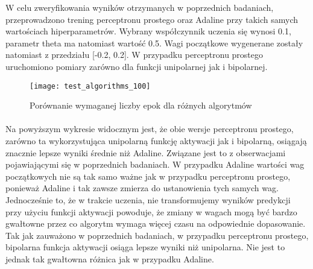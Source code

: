 \documentclass[\main/main.tex]{subfiles}
\begin{document}
    \justify
    W celu zweryfikowania wyników otrzymanych w poprzednich badaniach, przeprowadzono trening perceptronu prostego oraz Adaline przy takich samych wartościach hiperparametrów. Wybrany współczynnik uczenia się wynosi 0.1, parametr theta ma natomiast wartość 0.5. Wagi początkowe wygenerane zostały natomiast z przedziału [-0.2, 0.2]. W przypadku perceptronu prostego uruchomiono pomiary zarówno dla funkcji unipolarnej jak i bipolarnej.
    
    \begin{figure}[H]
    \centering
    \texttt{[image: test\_algorithms\_100]}
    \caption{Porównanie wymaganej liczby epok dla różnych algorytmów}
    \end{figure}
    
    \paragraph{}
    Na powyższym wykresie widocznym jest, że obie wersje perceptronu prostego, zarówno ta wykorzystująca unipolarną funkcję aktywacji jak i bipolarną, osiągają znacznie lepsze wyniki średnie niż Adaline. Związane jest to z obserwacjami pojawiającymi się w poprzednich badaniach. W przypadku Adaline wartości wag początkowych nie są tak samo ważne jak w przypadku perceptronu prostego, ponieważ Adaline i tak zawsze zmierza do ustanowienia tych samych wag. Jednocześnie to, że w trakcie uczenia, nie transformujemy wyników predykcji przy użyciu funkcji aktywacji powoduje, że zmiany w wagach mogą być bardzo gwałtowne przez co algorytm wymaga więcej czasu na odpowiednie dopasowanie.
    Tak jak zauważono w poprzednich badaniach, w przypadku perceptronu prostego, bipolarna funkcja aktywacji osiąga lepsze wyniki niż unipolarna. Nie jest to jednak tak gwałtowna różnica jak w przypadku Adaline.
    
\end{document}
